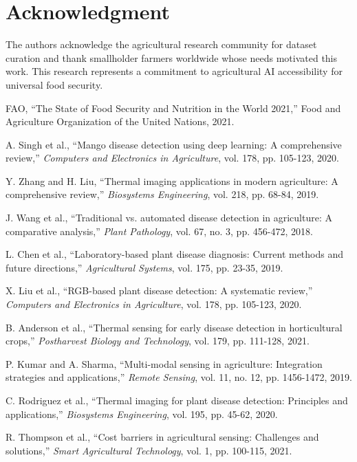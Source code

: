 \documentclass[conference]{IEEEtran}
\begin{document}
\section*{Acknowledgment}

The authors acknowledge the agricultural research community for dataset curation and thank smallholder farmers worldwide whose needs motivated this work. This research represents a commitment to agricultural AI accessibility for universal food security.

\begin{thebibliography}{00}
FAO, ``The State of Food Security and Nutrition in the World 2021,'' Food and Agriculture Organization of the United Nations, 2021.

A. Singh et al., ``Mango disease detection using deep learning: A comprehensive review,'' \textit{Computers and Electronics in Agriculture}, vol. 178, pp. 105-123, 2020.

Y. Zhang and H. Liu, ``Thermal imaging applications in modern agriculture: A comprehensive review,'' \textit{Biosystems Engineering}, vol. 218, pp. 68-84, 2019.

J. Wang et al., ``Traditional vs. automated disease detection in agriculture: A comparative analysis,'' \textit{Plant Pathology}, vol. 67, no. 3, pp. 456-472, 2018.

L. Chen et al., ``Laboratory-based plant disease diagnosis: Current methods and future directions,'' \textit{Agricultural Systems}, vol. 175, pp. 23-35, 2019.

X. Liu et al., ``RGB-based plant disease detection: A systematic review,'' \textit{Computers and Electronics in Agriculture}, vol. 178, pp. 105-123, 2020.

B. Anderson et al., ``Thermal sensing for early disease detection in horticultural crops,'' \textit{Postharvest Biology and Technology}, vol. 179, pp. 111-128, 2021.

P. Kumar and A. Sharma, ``Multi-modal sensing in agriculture: Integration strategies and applications,'' \textit{Remote Sensing}, vol. 11, no. 12, pp. 1456-1472, 2019.

C. Rodriguez et al., ``Thermal imaging for plant disease detection: Principles and applications,'' \textit{Biosystems Engineering}, vol. 195, pp. 45-62, 2020.

R. Thompson et al., ``Cost barriers in agricultural sensing: Challenges and solutions,'' \textit{Smart Agricultural Technology}, vol. 1, pp. 100-115, 2021.


\end{thebibliography}
\end{document}
